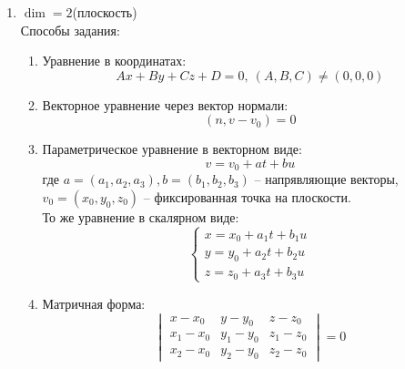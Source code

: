 \begin{enumerate}
	\item $\dim = 2$(плоскость) \\
	Способы задания:
	\begin{enumerate}[label={2.\arabic*)}]
		\item Уравнение в координатах:
				$$Ax + By + Cz + D = 0, ~ (A, B, C) \neq (0, 0, 0)$$
		\item Векторное уравнение через вектор нормали:
				$$(n, v - v_0) = 0$$
		\item Параметрическое уравнение в векторном виде:
				$$v = v_0 + at + bu$$ где $a = (a_1, a_2, a_3), b = (b_1, b_2, b_3)$ -- напрявляющие векторы, 
				$v_0 = (x_0 , y_0, z_0)$ -- фиксированная точка на плоскости. \\ 
				То же уравнение в скалярном виде:
				$$\begin{cases}
						x = x_0 + a_1t + b_1u\\
						y = y_0 + a_2t + b_2u \\
						z = z_0 + a_3t + b_3u
					\end{cases}$$
		\item Матричная форма:
				\[		
				\begin{vmatrix}
					x - x_0     & y - y_0 	& z - z_0 \\
					x_1 - x_0 & y_1 - y_0 	& z_1 - z_0 \\
					x_2 - x_0 & y_2 - y_0 & z_2 - z_0
				\end{vmatrix}
				= 0
				\]
	\end{enumerate}
\end{enumerate}
